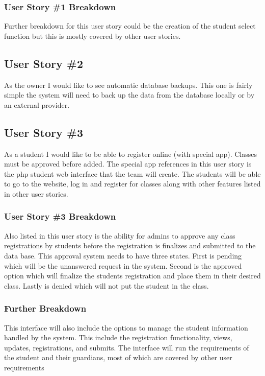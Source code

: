 \subsubsection{User Story \#1 Breakdown}
Further breakdown for this user story could be the creation of the student select function but this is mostly covered by other user stories.

\subsection{User Story \#2}
As the owner I would like to see automatic database backups. This one is fairly simple the system will need to back up the data from the database locally or by an external provider. 


\subsection{User Story \#3} 
As a student I would like to be able to register online (with special app). Classes must be approved before added. The special app references in this user story is the php student web interface that the team will create. The students will be able to go to the website, log in and register for classes along with other features listed in other user stories.

\subsubsection{User Story \#3 Breakdown}
Also listed in this user story is the ability for admins to approve any class registrations by students before the registration is finalizes and submitted to the data base. This approval system needs to have three states. First is pending which will be the unanswered request in the system. Second is the approved option which will finalize the students registration and place them in their desired class. Lastly is denied which will not put the student in the class.

\subsubsection{Further Breakdown}
This interface will also include the options to manage the student information handled by the system. This include the registration functionality, views, updates, registrations, and submits. The interface will run the requirements of the student and their guardians, most of which are covered by other user requirements

